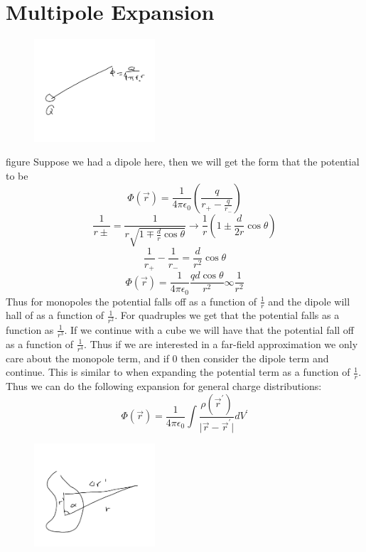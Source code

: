 \section{Multipole Expansion}
\begin{figure}[H]
    \centering
    \includegraphics[width=0.4\textwidth]{Figures/05.png}
    \caption{}
    \label{fig:}
\end{figure}figure  
Suppose we had a dipole here, then we will get the form that the potential to be 
\[
    \Phi (\vec{r} ) = \frac{1}{4 \pi \epsilon _0} \left(  \frac{q}{r_+ - \frac{q}{r_-}} \right) 
\]
\[
    \frac{1}{r{\pm}} = \frac{1}{r \sqrt{1 \mp \frac{d}{r}\cos \theta} } \to \frac{1}{r}\left( 1 \pm \frac{d}{2r}\cos \theta \right) 
\]
\[
    \frac{1}{r_+} - \frac{1}{r_-} = \frac{d}{r^{2}} \cos \theta
\]
\[
    \Phi (\vec{r} ) = \frac{1}{4\pi \epsilon _0 } \frac{qd \cos \theta}{r^{2} } \infty \frac{1}{r^{2} }
\]
Thus for monopoles the potential falls off as a function of \(\frac{1}{r}\) and the dipole will hall of as a function of 
\(\frac{1}{r^{2} }\). For quadruples we get that the potential falls as a function as \(\frac{1}{r^{3} }\). If we continue with a cube we will have that the potential fall off
as a function of \(\frac{1}{r^4}\). Thus if we are interested in a far-field approximation we only care about the monopole term, and if 0 then consider the dipole term and continue. 
This is similar to when expanding the potential term as a function of \(\frac{1}{r}\). Thus we can do the following expansion for general charge distributions:
\[
    \Phi (\vec{r} ) = \frac{1}{4\pi \epsilon _0} \int \frac{\rho (\vec{r} ^{\prime} )}{\vert \vec{r} -\vec{r} ^{\prime}  \vert } dV^{\prime} 
\] 
\begin{figure}[H]
    \centering
    \includegraphics[width=0.4\textwidth]{Figures/06.png}
    \caption{}
    \label{fig:}
\end{figure}
